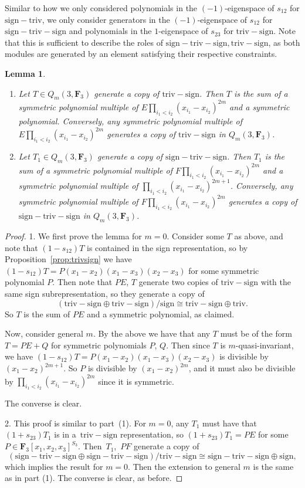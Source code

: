 \documentclass[11pt]{article}
\numberwithin{equation}{section}
\newtheorem{Lemma}[Theorem]{Lemma}
\theoremstyle{definition}
\numberwithin{equation}{section}
\newcommand{\triv}{\mathrm{triv}}
\newcommand{\sign}{\mathrm{sign}}
\newcommand{\six}{\mathrm{sign-triv-sign}}
\newcommand{\siv}{\mathrm{sign-triv}}
\newcommand{\tign}{\mathrm{triv-sign}}
\begin{document}
 Similar to how we only considered polynomials in the $(-1)$-eigenspace of $s_{12}$ for $\siv$, we only consider generators in the $(-1)$-eigenspace of $s_{12}$ for $\six$ and polynomials in the $1$-eigenspace of $s_{23}$ for $\tign$. Note that this is sufficient to describe the roles of $\six,\tign$, as both modules are generated by an element satisfying their respective constraints.

 \begin{Lemma}\label{lem:sixgen}
 \quad
 \begin{enumerate}\itemsep=0pt
\item[$1.$] Let $T\in Q_m(3,\mathbf{F}_3)$ generate a copy of $\tign$. Then $T$ is the sum of a symmetric polynomial multiple of $E\prod_{i_1<i_2}(x_{i_1}-x_{i_2})^{2m}$ and a symmetric polynomial. Conversely, any symmetric polynomial multiple of $E\prod_{i_1<i_2}(x_{i_1}-x_{i_2})^{2m}$ generates a copy of $\tign$ in $Q_m(3,\mathbf{F}_3)$.
\item[$2.$] Let $T_1\in Q_m(3,\mathbf{F}_3)$ generate a copy of $\six$. Then $T_1$ is the sum of a symmetric polynomial multiple of $F\prod_{i_1<i_2}(x_{i_1}-x_{i_2})^{2m}$ and a symmetric polynomial multiple of $\prod_{i_1<i_2}(x_{i_1}-x_{i_2})^{2m+1}$. Conversely, any symmetric polynomial multiple of $F\prod_{i_1<i_2}(x_{i_1}-x_{i_2})^{2m}$ generates a copy of $\six$ in $Q_m(3,\mathbf{F}_3)$.
 \end{enumerate}
 \end{Lemma}

 \begin{proof}
 1. We first prove the lemma for $m=0$. Consider some $T$ as above, and note that $(1-s_{12})T$ is contained in the sign representation, so by Proposition~\ref{prop:trivsign} we have $(1-s_{12})T=P(x_1-x_2)(x_1-x_3)(x_2-x_3)$ for some symmetric polynomial $P$. Then note that $PE$, $T$ generate two copies of $\tign$ with the same sign subrepresentation, so they generate a copy of
 \[(\tign\oplus\tign)/\sign\cong\tign\oplus\triv.\]
 So $T$ is the sum of $PE$ and a symmetric polynomial, as claimed.

 Now, consider general $m$. By the above we have that any $T$ must be of the form $T=PE+Q$ for symmetric polynomials $P$, $Q$. Then since $T$ is $m$-quasi-invariant, we have $(1-s_{12})T=P(x_1-x_2)(x_1-x_3)(x_2-x_3)$ is divisible by $(x_1-x_2)^{2m+1}$. So $P$ is divisible by $(x_1-x_2)^{2m}$, and it must also be divisible by $\prod_{i_1<i_2}(x_{i_1}-x_{i_2})^{2m}$ since it is symmetric.

 The converse is clear.

 2. This proof is similar to part~(1). For $m=0$, any $T_1$ must have that $(1+s_{23})T_1$ is in a~$\tign$ representation, so $(1+s_{23})T_1=PE$ for some $P\in\mathbf{F}_3[x_1,x_2,x_3]^{S_3}$. Then~$T_1$,~$PF$ generate a copy of
 \[(\six\oplus\six)/\tign\cong\six\oplus\sign,\]
 which implies the result for $m=0$. Then the extension to general $m$ is the same as in part (1). The converse is clear, as before.
 \end{proof}
\end{document}
